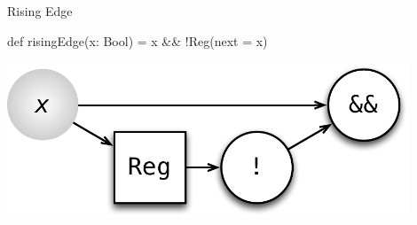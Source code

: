 \documentclass[xcolor=pdflatex,dvipsnames,table]{beamer}
\begin{document}
\begin{frame}[fragile]{Rising Edge}

\begin{scala}
def risingEdge(x: Bool) = x && !Reg(next = x)
\end{scala}

\begin{center}
\includegraphics[width=0.9\textwidth]{figs/rising-edge.pdf} 
\end{center}

\end{frame}
\end{document}
